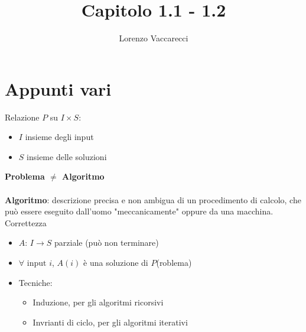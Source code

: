 \documentclass[12pt]{article}
\title{Capitolo 1.1 - 1.2}
\author{Lorenzo Vaccarecci}
\begin{document}
\maketitle
\section{Appunti vari}
Relazione \(P\) su \(I\times S\):
\begin{itemize}
    \setlength\itemsep{0em} 
    \item \(I\) insieme degli input
    \item \(S\) insieme delle soluzioni
\end{itemize}
\textbf{Problema \(\neq\) Algoritmo}
\\\\\textbf{Algoritmo}: descrizione precisa e non ambigua di un procedimento di calcolo, che può essere eseguito dall'uomo "meccanicamente" oppure da una macchina.
\\ Correttezza
\begin{itemize}
    \setlength\itemsep{0em}
    \item \(A\): \(I\rightarrow S\) parziale (può non terminare)
    \item \(\forall \text{ input } i\), \(A(i)\) è una soluzione di \(P\)(roblema)
    \item Tecniche:
    \begin{itemize}
        \item Induzione, per gli algoritmi ricorsivi
        \item Invrianti di ciclo, per gli algoritmi iterativi
    \end{itemize}
\end{itemize}
\end{document}
